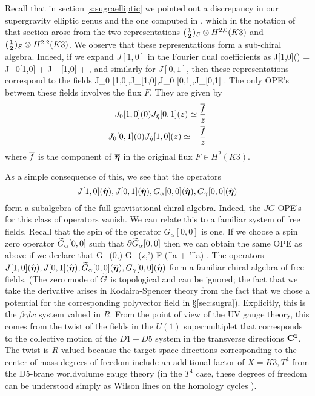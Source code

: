 \documentclass[../main.tex]{subfiles}
\begin{document}
Recall that in section \ref{s:sugraelliptic} we pointed out a discrepancy in our supergravity elliptic genus and the one computed in \cite{deBoerEG}, which in the notation of that section arose from the two representations $(\frac{\bf 1}{\bf 2})_S \otimes H^{2,0}(K3)$ and $(\frac{\bf 1}{\bf 2})_S \otimes H^{2,2}(K3)$.
We observe that these representations form a sub-chiral algebra. 
Indeed, if we expand $J[1,0]$ in the Fourier dual coefficients as
\beqn
J[1,0](\what \bfeta) = J_0[1,0] + \what \eta J_{\what \eta} [1,0] + \cdots ,
\eeqn
and similarly for $J[0,1]$, then these representations correspond to the fields 
\beqn
J_0 [1,0],J_{\what \eta}[1,0],J_0 [0,1],J_{\what \eta}[0,1] .
\eeqn
The only OPE's between these fields involves the flux $F$.
They are given by
\begin{align*}
J_0 [1,0](0) J_{\Hat \eta} [0,1] (z) \simeq \frac{\overline f}{z}  \\ 
J_0[0,1] (0) J_{\Hat \eta} [1,0] (z) \simeq - \frac{\overline f}{z} 
\end{align*}
where $\overline f$ is the component of $\overline {\boldsymbol\eta}$ in the original flux $F \in H^2(K3)$.

As a simple consequence of this, we see that the operators 
\[
J[1,0](\Hat {\boldsymbol\eta}), J[0,1](\Hat {\boldsymbol\eta}),G_\alpha[0,0](\Hat {\boldsymbol\eta}), G_\gamma[0,0](\Hat {\boldsymbol\eta})
\]
form a subalgebra of the full gravitational chiral algebra.
Indeed, the $JG$ OPE's for this class of operators vanish.
We can relate this to a familiar system of free fields.
Recall that the spin of the operator $G_\alpha[0,0]$ is one.
If we choose a spin zero operator $\widetilde G_{\alpha}[0,0]$ such that $\partial \widetilde G_\alpha [0,0]$ then we can obtain the same OPE as above if we declare that 
\beqn
\til G_\alpha[0,0](0,\what \bfeta) G_\gamma[0,0](z,\what \bfeta') \simeq {} \what F (\what \bfeta^a + \what \bfeta'^a) .
\eeqn
The operators $J[1,0](\Hat {\boldsymbol\eta}), J[0,1](\Hat {\boldsymbol\eta}),\widetilde G_\alpha[0,0](\Hat {\boldsymbol\eta}), G_\gamma[0,0](\Hat {\boldsymbol\eta})$ form a familiar chiral algebra of free fields. (The zero mode of $\widetilde G$ is topological and can be ignored; the fact that we take the derivative arises in Kodaira-Spencer theory from the fact that we chose a potential for the corresponding polyvector field in \S \ref{sec:sugra}). 
Explicitly, this is the $\beta \gamma bc$ system valued in $R$. From the point of view of the UV gauge theory, this comes from the twist of the fields in the $U(1)$ supermultiplet that corresponds to the collective motion of the $D1-D5$ system in the transverse directions $\mathbf{C}^2$. The twist is $R$-valued because the target space directions corresponding to the center of mass degrees of freedom include an additional factor of $X =K3, T^4$ from the D5-brane worldvolume gauge theory (in the $T^4$ case, these degrees of freedom can be understood simply as Wilson lines on the homology cycles \cite{Davidetal}). 
\end{document}
